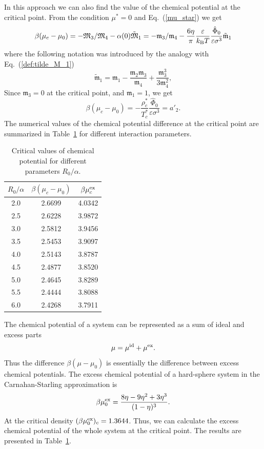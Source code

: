 In this approach we can also find the value of the chemical potential at the critical point. From the condition $\mu^*=0$ and Eq.~(\ref{mu_star}) we get
$$
	\beta(\mu_c - \mu_0) = -\mathfrak{M}_3/\mathfrak{M}_4 - \alpha(0)\tilde{\mathfrak{M}}_1 
	= -\mathfrak{m}_3/\mathfrak{m}_4 - \frac{6\eta}{\pi} \frac{\varepsilon}{k_{\rm{B}}T} \frac{\hat{\Phi}_0}{\varepsilon\sigma^3} \tilde{\mathfrak{m}}_1
$$
where the following notation was introduced by the analogy with Eq.~(\ref{def:tilde_M_1})
\begin{equation}
	\tilde{\mathfrak{m}}_1 = \mathfrak{m}_1 -\frac{\mathfrak{m}_2 \mathfrak{m}_3}{\mathfrak{m}_4} + \frac{\mathfrak{m}_3^3}{3\mathfrak{m}_4^2},
\end{equation}
Since $\mathfrak{m}_3 = 0$ at the critical point, and $\mathfrak{m}_1 = 1$, we get
\begin{equation}
	\beta(\mu_c - \mu_0) = -\frac{\rho^*_c}{T^*_c} \frac{\hat{\Phi}_0}{\varepsilon\sigma^3} = a'_2.
\end{equation}
The numerical values of the chemical potential difference at the critical point are summarized in Table~\ref{tab:critical_chem_potential} for different interaction parameters.

\begin{table}[h]
	\caption{Critical values of chemical potential for different parameters $R_0/\alpha$.}
	\label{tab:critical_chem_potential}
	\begin{center}
		\begin{tabular}{|c|c|c|}
			\hline
			$R_0/\alpha$ \quad & $\beta(\mu_c - \mu_0)$ \quad & $\beta\mu^{\rm{ex}}_c$ \quad \quad \\
			\hline
			2.0  & 2.6699 & 4.0342 \\
			2.5  & 2.6228 & 3.9872 \\
			3.0  & 2.5812 & 3.9456 \\
			3.5  & 2.5453 & 3.9097 \\
			4.0  & 2.5143 & 3.8787 \\
			4.5  & 2.4877 & 3.8520 \\
			5.0  & 2.4645 & 3.8289 \\
			5.5  & 2.4444 & 3.8088 \\
			6.0  & 2.4268 & 3.7911 \\
			\hline
		\end{tabular}
	\end{center}
\end{table}

The chemical potential of a system can be represented as a sum of ideal and excess parts
$$
	\mu = \mu^{\rm{id}} + \mu^{\rm{ex}}.
$$
Thus the difference $\beta(\mu - \mu_0)$ is essentially the difference between excess chemical potentials. The excess chemical potential of a hard-sphere system in the Carnahan-Starling approximation is
\begin{equation}
	\beta\mu^{\rm{ex}}_0 = \frac{8\eta - 9\eta^2 + 3\eta^3}{(1-\eta)^3}.
\end{equation}
At the critical density $(\beta\mu^{\rm{ex}}_0)_c = 1.3644$. Thus, we can calculate the excess chemical potential of the whole system at the critical point. The results are presented in Table~\ref{tab:critical_chem_potential}.
